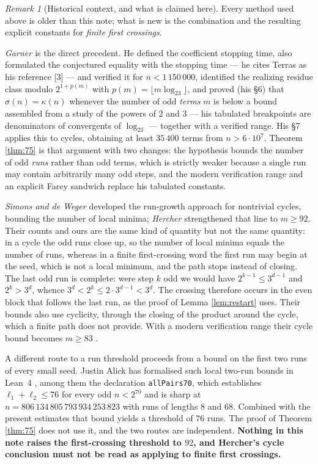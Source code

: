 \documentclass[11pt,a4paper]{article}
\theoremstyle{plain}\newtheorem{theorem}{Theorem}\newtheorem{proposition}[theorem]{Proposition}
\theoremstyle{definition}\newtheorem{example}[theorem]{Example}
\theoremstyle{remark}\newtheorem{remark}[theorem]{Remark}
\begin{document}
\begin{remark}[Historical context, and what is claimed here]\label{rem:history}
Every method used above is older than this note; what is new is the combination and the
resulting explicit constants for \emph{finite first crossings}.

\emph{Garner \cite{garner1981}} is the direct precedent. He defined the coefficient stopping
time, also formulated the conjectured equality with the stopping time --- he cites Terras
\cite{terras1976} as his reference [3] --- and verified it for
$n<1\,150\,000$, identified the realizing residue class modulo $2^{1+p(m)}$ with
$p(m)=\lfloor m\log_23\rfloor$, and proved (his \S6) that $\sigma(n)=\kappa(n)$ whenever the
number of odd \emph{terms} $m$ is below a bound assembled from a study of the powers of $2$ and
$3$ --- his tabulated breakpoints are denominators of convergents of $\log_23$ --- together with
a verified range. His \S7 applies this to cycles, obtaining at least $35\,400$ terms from
$n>6\cdot10^7$. Theorem \ref{thm:75} is that argument with two changes: the hypothesis bounds
the number of odd \emph{runs} rather than odd terms, which is strictly weaker because a single
run may contain arbitrarily many odd steps, and the modern verification range and an explicit
Farey sandwich replace his tabulated constants.

\emph{Simons and de Weger \cite{simonsdeweger2005}} developed the run-growth approach for
nontrivial cycles, bounding the number of local minima; \emph{Hercher \cite{hercher2023}}
strengthened that line to $m\ge92$. Their counts and ours are the same kind of quantity but not
the same quantity: in a cycle the odd runs close up, so the number of local minima equals the
number of runs, whereas in a finite first-crossing word the first run may begin at the seed,
which is not a local minimum, and the path stops instead of closing. The last odd run is
complete: were step $k$ odd we would have $2^{k-1}\le3^{d-1}$ and $2^k>3^d$, whence
$3^d<2^k\le2\cdot3^{d-1}<3^d$. The crossing therefore occurs in the even block that follows
the last run, as the proof of Lemma \ref{lem:restart} uses. Their bounds also use
cyclicity, through the closing of the product around the cycle, which a finite path does not
provide. With a modern verification range their cycle bound becomes $m\ge83$
\cite{hercher2023}.

A different route to a run threshold proceeds from a bound on the first two runs of every small
seed. Justin Alick has formalised such local two-run bounds in Lean~4 \cite{alick2026}, among
them the declaration \texttt{allPairs70}, which establishes $\ell_1+\ell_2\le76$ for every odd $n<2^{70}$ and is
sharp at $n=806\,134\,805\,793\,934\,253\,823$ with runs of lengths $8$ and $68$. Combined
with the present estimates that bound yields a threshold of $76$ runs. The proof of
Theorem \ref{thm:75} does not use it, and the two routes are independent. \textbf{Nothing in this note
raises the first-crossing threshold to $92$, and Hercher's cycle conclusion must not be read as
applying to finite first crossings.}


\end{remark}
\end{document}

